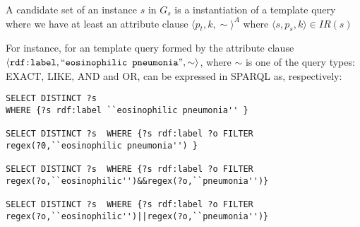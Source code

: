 \begin{definition}   A candidate set of an instance $s$ in $G_s$ is a instantiation of a template query where we have at least an attribute clause $\langle p_t,k,\sim \rangle^A$ where $\langle s,p_s,k \rangle \in IR(s)$
\end{definition} 

For instance, for an template query formed by the attribute clause $\langle\verb+rdf:label+,``\verb+eosinophilic+$  $\verb+pneumonia+",\sim\rangle$, where $\sim$ is one of the query types: EXACT, LIKE, AND and OR, can be expressed in SPARQL as, respectively: 

\begin{footnotesize} 
\begin{verbatim}
SELECT DISTINCT ?s  
WHERE {?s rdf:label ``eosinophilic pneumonia'' } 
 
SELECT DISTINCT ?s  WHERE {?s rdf:label ?o FILTER
regex(?0,``eosinophilic pneumonia'') } 

SELECT DISTINCT ?s  WHERE {?s rdf:label ?o FILTER 
regex(?o,``eosinophilic'')&&regex(?o,``pneumonia'')} 

SELECT DISTINCT ?s  WHERE {?s rdf:label ?o FILTER
regex(?o,``eosinophilic'')||regex(?o,``pneumonia'')} 
\end{verbatim}
\end{footnotesize}

